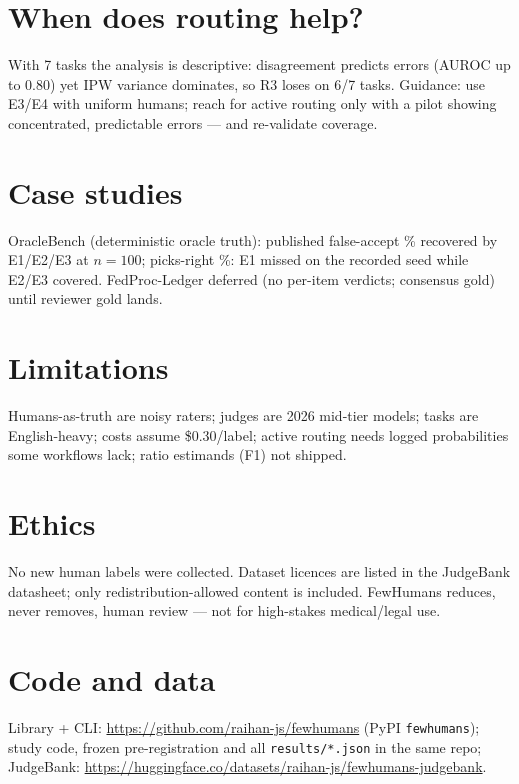 \documentclass[11pt]{article}
\begin{document}
\section{When does routing help?}
With 7 tasks the analysis is descriptive: disagreement predicts errors
(AUROC up to 0.80) yet IPW variance dominates, so R3 loses on 6/7 tasks.
Guidance: use E3/E4 with uniform humans; reach for active routing only with a
pilot showing concentrated, predictable errors --- and re-validate coverage.

\section{Case studies}
OracleBench (deterministic oracle truth): published false-accept
\DogPointPub\% recovered by E1/E2/E3 at $n=100$; picks-right \DogPairPub\%:
E1 missed on the recorded seed while E2/E3 covered. FedProc-Ledger deferred
(no per-item verdicts; consensus gold) until reviewer gold lands.

\section{Limitations}
Humans-as-truth are noisy raters; judges are 2026 mid-tier models; tasks are
English-heavy; costs assume \$0.30/label; active routing needs logged
probabilities some workflows lack; ratio estimands (F1) not shipped.

\section{Ethics}
No new human labels were collected. Dataset licences are listed in the
JudgeBank datasheet; only redistribution-allowed content is included.
FewHumans reduces, never removes, human review --- not for high-stakes
medical/legal use.

\section*{Code and data}
Library + CLI: \url{https://github.com/raihan-js/fewhumans} (PyPI
\texttt{fewhumans}); study code, frozen pre-registration and all
\texttt{results/*.json} in the same repo; JudgeBank:
\url{https://huggingface.co/datasets/raihan-js/fewhumans-judgebank}.



\end{document}
